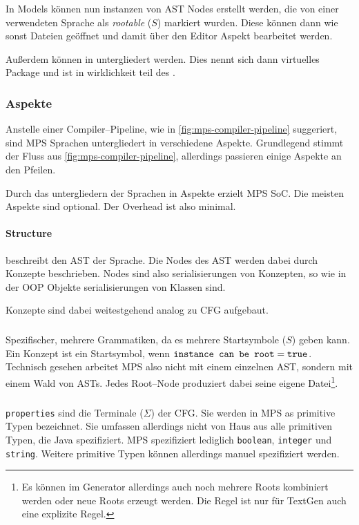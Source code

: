 In Models können nun instanzen von \ac{AST} Nodes erstellt werden, die von einer verwendeten Sprache als \textit {rootable} ($S$) markiert wurden.
Diese können dann wie sonst Dateien geöffnet und damit über den Editor Aspekt bearbeitet werden.

Außerdem können  in  untergliedert werden.
Dies nennt sich dann virtuelles Package und ist in wirklichkeit teil des .

\subsubsection{Aspekte}\label{subsubsec:aspekte}
Anstelle einer Compiler--Pipeline, wie in \autoref{fig:mps-compiler-pipeline} suggeriert, sind \ac{MPS} Sprachen untergliedert in verschiedene Aspekte.
Grundlegend stimmt der Fluss aus \autoref{fig:mps-compiler-pipeline}, allerdings passieren einige Aspekte an den Pfeilen.

Durch das untergliedern der Sprachen in Aspekte erzielt \ac{MPS} \ac{SoC}.
Die meisten Aspekte sind optional.
Der Overhead ist also minimal.

\paragraph{Structure} beschreibt den \ac{AST} der Sprache.
Die Nodes des \ac{AST} werden dabei durch Konzepte beschrieben.
Nodes sind also serialisierungen von Konzepten, so wie in der \ac{OOP} Objekte serialisierungen von Klassen sind.


Konzepte sind dabei weitestgehend analog zu \ac{CFG} aufgebaut.

\subparagraph*{}
Spezifischer, mehrere Grammatiken, da es mehrere Startsymbole ($S$) geben kann.
Ein Konzept ist ein Startsymbol, wenn $\verb|instance can be root|=\verb|true|$.
Technisch gesehen arbeitet \ac{MPS} also nicht mit einem einzelnen \ac{AST}, sondern mit einem Wald von \acp{AST}.
Jedes Root--Node produziert dabei seine eigene Datei\footnote{Es können im Generator allerdings auch noch mehrere Roots kombiniert werden oder neue Roots erzeugt werden. Die Regel ist nur für TextGen auch eine explizite Regel.}.

\subparagraph*{}
\verb|properties| sind die Terminale ($\Sigma$) der \ac{CFG}.
Sie werden in \ac{MPS} as primitive Typen bezeichnet.
Sie umfassen allerdings nicht von Haus aus alle primitiven Typen, die Java spezifiziert.
\ac{MPS} spezifiziert lediglich \verb|boolean|, \verb|integer| und \verb|string|.
Weitere primitive Typen können allerdings manuel spezifiziert werden.


